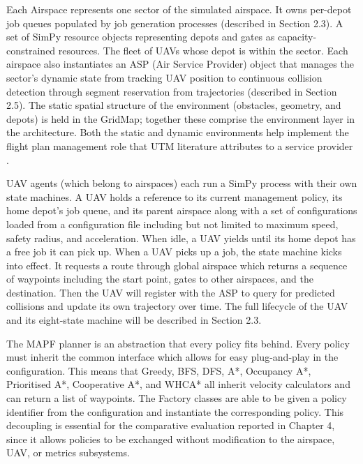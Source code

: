Each Airspace represents one sector of the simulated airspace. It owns per-depot job queues populated by job generation processes (described in Section 2.3). A set of SimPy resource objects representing depots and gates as capacity-constrained resources. The fleet of UAVs whose depot is within the sector. Each airspace also instantiates an ASP (Air Service Provider) object that manages the sector's dynamic state from tracking UAV position to continuous collision detection through segment reservation from trajectories (described in Section 2.5). The static spatial structure of the environment (obstacles, geometry, and depots) is held in the GridMap; together these comprise the environment layer in the architecture. Both the static and dynamic environments help implement the flight plan management role that UTM literature attributes to a service provider \cite{kopardekar2014utm, faa2020utmconops}.\par

\vspace{1em}

UAV agents (which belong to airspaces) each run a SimPy process with their own state machines. A UAV holds a reference to its current management policy, its home depot's job queue, and its parent airspace along with a set of configurations loaded from a configuration file including but not limited to maximum speed, safety radius, and acceleration. When idle, a UAV yields until its home depot has a free job it can pick up. When a UAV picks up a job, the state machine kicks into effect. It requests a route through global airspace which returns a sequence of waypoints including the start point, gates to other airspaces, and the destination. Then the UAV will register with the ASP to query for predicted collisions and update its own trajectory over time. The full lifecycle of the UAV and its eight-state machine will be described in Section 2.3.\par

\vspace{1em}

The MAPF planner is an abstraction that every policy fits behind. Every policy must inherit the common interface which allows for easy plug-and-play in the configuration. This means that Greedy, BFS, DFS, A*, Occupancy A*, Prioritised A*, Cooperative A*, and WHCA* all inherit velocity calculators and can return a list of waypoints. The Factory classes are able to be given a policy identifier from the configuration and instantiate the corresponding policy. This decoupling is essential for the comparative evaluation reported in Chapter 4, since it allows policies to be exchanged without modification to the airspace, UAV, or metrics subsystems. \par

